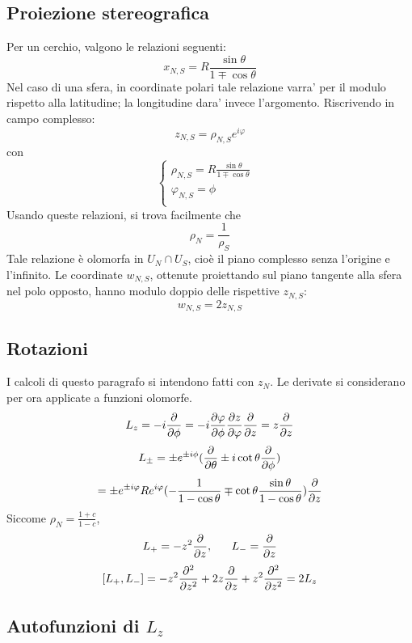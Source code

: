 \subsection{Proiezione stereografica}
Per un cerchio, valgono le relazioni seguenti:
\[ x_{N,S} = R \frac{\sin\theta}{1\mp\cos\theta} \]
Nel caso di una sfera, in coordinate polari tale relazione varra' per il modulo rispetto alla latitudine; la longitudine dara' invece l'argomento. Riscrivendo in campo complesso:
\[ z_{N,S} = \rho_{N,S} e^{i\varphi} \]
con 
\[ \begin{cases}
	\rho_{N,S} = R \frac{\sin\theta}{1\mp\cos\theta} & \\
	\varphi_{N,S} = \phi & \\
   \end{cases}
\]
Usando queste relazioni, si trova facilmente che 
\[ \rho_N = \frac{1}{\rho_S} \]
Tale relazione \`e olomorfa in \( U_N \cap U_S \), cio\`e il piano complesso senza l'origine e l'infinito.
Le coordinate $w_{N,S}$, ottenute proiettando sul piano tangente alla sfera nel polo opposto, hanno modulo doppio delle rispettive $z_{N,S}$:
\[ w_{N,S} = 2z_{N,S} \]

\subsection{Rotazioni}
I calcoli di questo paragrafo si intendono fatti con $z_N$. Le derivate si considerano per ora applicate a funzioni olomorfe.
\[ L_z = -i\frac{\partial }{\partial \phi} = -i \frac{\partial \varphi}{\partial \phi}\frac{\partial z}{\partial \varphi}\frac{\partial }{\partial z} = z\frac{\partial }{\partial z} \]
\[ L_\pm = \pm e^{\pm i\phi} (\frac{\partial }{\partial \theta} \pm i \cot\theta \frac{\partial }{\partial \phi} ) \]
\[ = \pm e^{\pm i\varphi}Re^{i\varphi}  (-\frac{1}{1- \cos\theta} \mp  \cot\theta \frac{\sin\theta}{1-\cos\theta})\frac{\partial }{\partial z}  \]
Siccome \( \rho_N = \frac{1+c}{1-c}\),
\[ L_+ = -z^2\frac{\partial }{\partial z} , \;\;\;\;\;\;  L_- = \frac{\partial }{\partial z} \]
\[ [L_+,L_-] = -z^2\frac{\partial ^2}{\partial z^2} + 2z\frac{\partial }{\partial z} + z^2\frac{\partial ^2}{\partial z^2} = 2L_z \]

\subsection{Autofunzioni di $L_z$}
